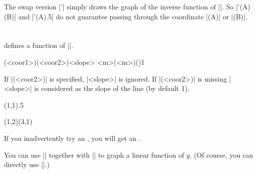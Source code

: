 \remark The swap version |\tzfn'| simply draws the graph of the inverse function of |\tzfn|.
So |\tzfn'(A)(B)| and |\tzfn'(A){.5}| do not guarantee passing through the coordinate |(A)| or |(B)|.

\begin{tzcode}{.3}
\end{tzcode}





\section{\protect\cmd{\tzdefLFnofy}}
\label{s:tzdefLFnofy}

\icmd{\tzdefLFnofy} defines a function of |\y|.

\begin{tzdef}
(<coor1>)(<coor2>){<slope>}
{<m>}(<m>)(){1}
\end{tzdef}

If |(<coor2>)| is specified, |{<slope>}| is ignored.
If |(<coor2>)| is missing |<slope>| is considered as the slope of the line (by default 1). 


\begin{tztikz}
\tzdefLFnofy\Fy(1,1){.5} %
  \def\Fy{.5*(\y-1)+1}
\end{tztikz}

\begin{tztikz}
\tzdefLFnofy\Gy(1,2)(3,1) %
  \def\Gy{-2*(\y-2)+1}
\end{tztikz}


\remark If you inadvertently try an , you will get an .

You can use |\tzdefLFnofy| together with |\tzFnofy| to graph a linear function of $y$.
(Of course, you can directly use |\tzLFnofy|.)


\begin{tzcode}{.3}
{}
\end{tzcode}

